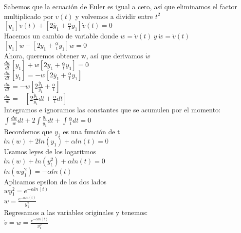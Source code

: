 \documentclass{article}
\begin{document}
\begin{enumerate}
{        	Sabemos que la ecuación de Euler es igual a cero, así que eliminamos el factor multiplicado por $v(t)$ y volvemos a dividir entre $t^2$\\
        	$[y_1]\ddot{v}(t) + [2\dot{y_1} + \frac{\alpha}{t}y_1]\dot{v}(t) = 0$\\
        	
        	Hacemos un cambio de variable donde $w = \dot{v}(t) \ y \  \dot{w} = \ddot{v}(t)$\\
        	$[y_1]\dot{w} + [2\dot{y_1} + \frac{\alpha}{t}y_1]w = 0$\\
        	
        	Ahora, queremos obtener w, así que derivamos $\dot{w}$\\
        	$\frac{dw}{dt}[y_1] + w[2\dot{y_1} + \frac{\alpha}{t}y_1] = 0$\\
        	$\frac{dw}{dt}[y_1] = - w[2\dot{y_1} + \frac{\alpha}{t}y_1]$\\
        	$\frac{dw}{dt} = - w[2\frac{\dot{y_1}}{y_1} + \frac{\alpha}{t}]$\\
        	$\frac{dw}{w} = - [2\frac{\dot{y_1}}{y_1}dt + \frac{\alpha}{t}dt]$\\
        	
        	Integramos e ignoramos las constantes que se acumulen por el momento:\\
        	$\int \frac{dw}{w} dt + 2 \int \frac{\dot{y_1}}{y_1} dt + \int \frac{\alpha}{t} dt = 0 $\\
        	
        	Recordemos que $y_1$ es una función de t\\
        	$ln(w) + 2ln(y_1) + \alpha ln(t) = 0$\\
        	
        	Usamos leyes de los logaritmos\\
        	$ln(w) + ln(y_1^2) + \alpha ln(t) = 0$\\
        	$ln(w y_1^2) = -\alpha ln(t) $\\
        	
        	Aplicamos epsilon de los dos lados\\
        	$wy_1^2 = e^{-\alpha ln(t)}$\\
        	$w = \frac{e^{-\alpha ln(t)}}{y_1^2}$\\
        	
        	Regresamos a las variables originales y tenemos:\\
        	$\dot{v} = w = \frac{e^{-\alpha ln(t)}}{y_1^2}$\\
        	
}
\end{enumerate}
\end{document}
